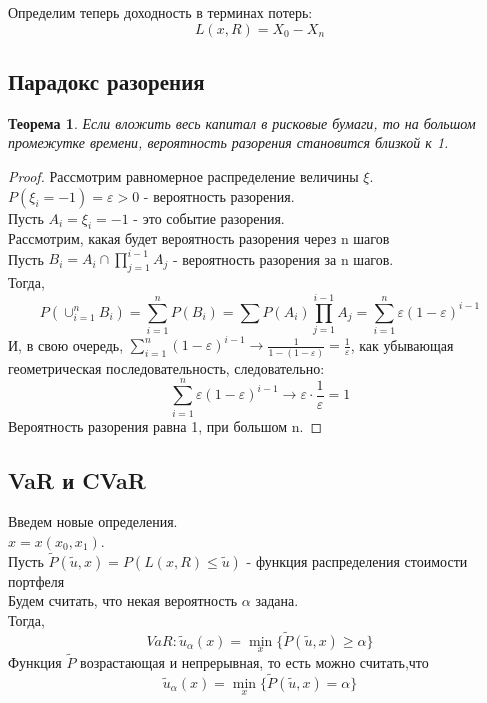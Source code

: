 \documentclass[18pt,a4paper]{article}
\theoremstyle{plain}
\newtheorem{Th}{Теорема}[section]
\theoremstyle{definition}
\begin{document}
Определим теперь доходность в терминах потерь:
$$
L(x,R) = X_0 - X_n
$$

\centering\subsection{Парадокс разорения}
\flushleft

\begin{Th} \label{main}
Если вложить весь капитал в рисковые бумаги, то на большом промежутке времени, вероятность разорения становится близкой к 1.
\end{Th}
\begin{proof}
Рассмотрим равномерное распределение величины $\xi$.\\
$P(\xi_i = -1) = \varepsilon >0$ - вероятность разорения.\\
Пусть $A_i = \xi_i = -1$ - это событие разорения.\\
Рассмотрим, какая будет вероятность разорения через n шагов \\
Пусть $B_i=A_i\cap \prod\limits_{j=1}^{i-1}A_j$ - вероятность разорения за n шагов.\\
Тогда,
$$
P(\cup_{i=1}^n B_i) = \sum\limits_{i=1}^n P(B_i) = \sum P(A_i) \prod\limits_{j=1}^{i-1}A_j = \sum\limits_{i=1}^n \varepsilon (1-\varepsilon)^{i-1}
$$
И, в свою очередь, $\sum\limits_{i=1}^n (1-\varepsilon)^{i-1} \longrightarrow \frac{1}{1-(1-\varepsilon)} = \frac{1}{\varepsilon}$, как убывающая геометрическая последовательность, следовательно:\\
$$
\sum\limits_{i=1}^n \varepsilon (1-\varepsilon)^{i-1}  \longrightarrow \varepsilon \cdot \frac{1}{\varepsilon} = 1
$$
Вероятность разорения равна 1, при большом n.
\end{proof}

\centering\subsection{VaR и CVaR}
\flushleft
Введем новые определения.\\
$x = x(x_0,x_1)$.\\
Пусть $\tilde{P}(\tilde{u},x) = P(L(x,R) \le \tilde{u})$ - функция распределения стоимости портфеля\\
Будем считать, что некая вероятность $\alpha$ задана.\\
Тогда,\\
\vspace{2mm}
$$
VaR: \tilde{u}_\alpha (x) = \min\limits_{x} \{\tilde{P}(\tilde{u},x)\ge \alpha\}
$$
Функция $\tilde{P}$ возрастающая и непрерывная, то есть можно считать,что
$$
\tilde{u}_\alpha(x) = \min\limits_{x} \{\tilde{P}(\tilde{u},x) = \alpha\}
$$
\end{document}
